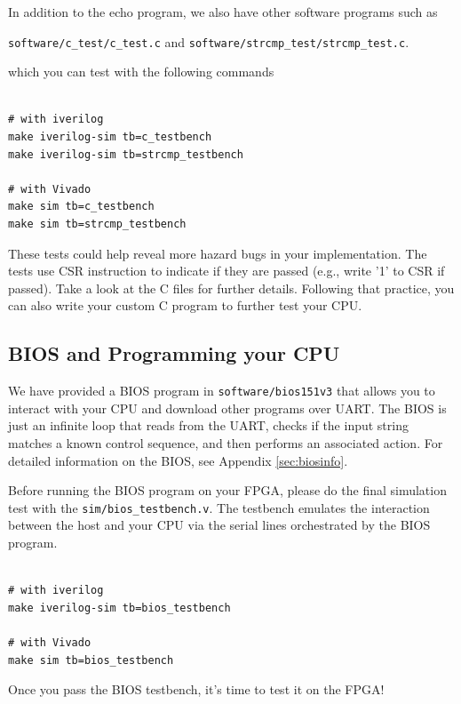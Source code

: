 \documentclass[11pt]{article}
\begin{document}
In addition to the echo program, we also have other software programs such as

\verb|software/c_test/c_test.c| and \verb|software/strcmp_test/strcmp_test.c|. 

which you can test with the following commands

\begin{verbatim}

# with iverilog
make iverilog-sim tb=c_testbench
make iverilog-sim tb=strcmp_testbench

# with Vivado
make sim tb=c_testbench
make sim tb=strcmp_testbench

\end{verbatim}

These tests could help reveal more hazard bugs in your implementation. The tests use CSR instruction to indicate if they are passed (e.g., write '1' to CSR if passed). Take a look at the C files for further details. Following that practice, you can also write your custom C program to further test your CPU.

\subsection{BIOS and Programming your CPU}
\label{bios_info}

We have provided a BIOS program in \verb|software/bios151v3| that allows you to interact with your CPU and download other programs over UART.
The BIOS is just an infinite loop that reads from the UART, checks if the input string matches a known control sequence, and then performs an associated action.
For detailed information on the BIOS, see Appendix \ref{sec:biosinfo}.

Before running the BIOS program on your FPGA, please do the final simulation test with the \verb|sim/bios_testbench.v|. The testbench emulates the interaction between the host and your CPU via the serial lines orchestrated by the BIOS program.

\begin{verbatim}

# with iverilog
make iverilog-sim tb=bios_testbench

# with Vivado
make sim tb=bios_testbench
\end{verbatim}

Once you pass the BIOS testbench, it's time to test it on the FPGA!
\end{document}
